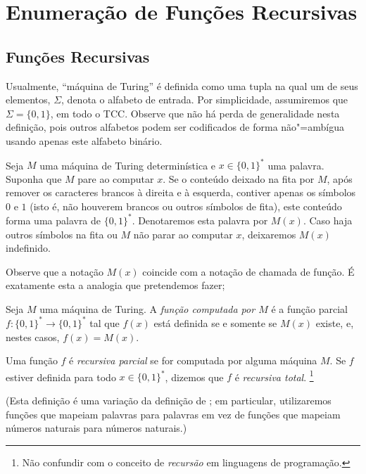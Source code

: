 \section{Enumeração de Funções Recursivas}
\label{sec:enumeration_of_recursive_functions}

\subsection{Funções Recursivas}

Usualmente,
``máquina de Turing'' é definida como uma tupla
na qual um de seus elementos,
$\Sigma$,
denota o alfabeto de entrada.
Por simplicidade,
assumiremos que $\Sigma = \{0, 1\}$,
em todo o TCC.
Observe que não há perda de generalidade nesta definição,
pois outros alfabetos podem ser codificados de forma não"=ambígua
usando apenas este alfabeto binário.

\begin{notation}
    Seja $M$ uma máquina de Turing determinística
    e $x \in \{0, 1\}^*$ uma palavra.
    Suponha que $M$ pare ao computar $x$.
    Se o conteúdo deixado na fita por $M$,
    após remover os caracteres brancos à direita e à esquerda,
    contiver apenas os símbolos $0$ e $1$
    (isto é, não houverem brancos ou outros símbolos de fita),
    este conteúdo forma uma palavra de $\{0, 1\}^*$.
    Denotaremos esta palavra por $M(x)$.
    Caso haja outros símbolos na fita
    ou $M$ não parar ao computar $x$,
    deixaremos $M(x)$ indefinido.
\end{notation}

Observe que a notação $M(x)$ coincide com a notação de chamada de função.
É exatamente esta a analogia que pretendemos fazer;

\begin{definition}
    \label{def:recursive_function}
    Seja $M$ uma máquina de Turing.
    A \emph{função computada por $M$}
    é a função parcial $f: \{0, 1\}^* \to \{0, 1\}^*$
    tal que $f(x)$ está definida se e somente se $M(x)$ existe,
    e, nestes casos, $f(x) = M(x)$.

    Uma função $f$ é \emph{recursiva parcial}
    se for computada por alguma máquina $M$.
    Se $f$ estiver definida para todo $x \in \{0, 1\}^*$,
    dizemos que $f$ é \emph{recursiva total}.
    \footnote{
        Não confundir com o conceito de \emph{recursão} em linguagens de programação.
    }
\end{definition}
(Esta definição é uma variação da definição de ;
em particular, utilizaremos funções que mapeiam palavras para palavras
em vez de funções que mapeiam números naturais para números naturais.)

